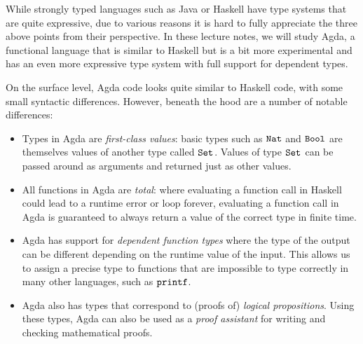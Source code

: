 \documentclass[a4paper,UKenglish]{tufte-handout}
\theoremstyle{definition}
\newcommand\prim[1]{{\AgdaPrimitive{#1}}}
\newcommand\ty[1]{{{\prim{Set}}_{#1}}}
\newcommand\fun[1]{{\AgdaFunction{#1}}}
\newcommand\data[1]{{\AgdaFunction{#1}}}
\newcommand\Nat{\data{Nat}}
\newcommand\Bool{\data{Bool}}
\begin{document}
While strongly typed languages such as Java or Haskell have type
systems that are quite expressive, due to various reasons it is hard
to fully appreciate the three above points from their
perspective. In these lecture notes, we will study Agda, a functional language that
is similar to Haskell but is a bit more experimental and has an even
more expressive type system with full support for dependent types.

On the surface level, Agda code looks quite similar to Haskell code,
with some small syntactic differences. However, beneath the hood are a
number of notable differences:
\begin{itemize}

\item Types in Agda are \emph{first-class values}: basic types such as
  $\Nat$ and $\Bool$ are themselves values of another type called
  $\ty{}$. Values of type $\ty{}$ can be passed around as arguments
  and returned just as other values.

\item All functions in Agda are \emph{total}: where evaluating a
  function call in Haskell could lead to a runtime error or loop
  forever, evaluating a function call in Agda is guaranteed to always
  return a value of the correct type in finite time.

\item Agda has support for \emph{dependent function types} where the
  type of the output can be different depending on the runtime value
  of the input. This allows us to assign a precise type to functions
  that are impossible to type correctly in many other languages, such
  as $\fun{printf}$.

\item Agda also has types that correspond to (proofs of) \emph{logical
  propositions}. Using these types, Agda can also be used as a
  \emph{proof assistant} for writing and checking mathematical proofs.

\end{itemize}
\end{document}
